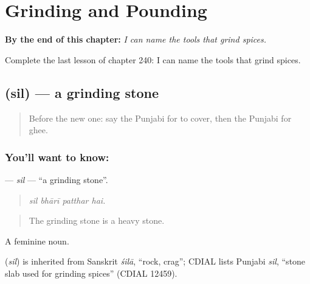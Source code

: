 
\chapter{Grinding and Pounding}
\label{ch:pa-a2-grinding-and-pounding}

\begin{chapteropening}
\textbf{By the end of this chapter:} \emph{I can name the tools that grind spices.}

Complete the last lesson of chapter 240: I can name the tools that grind spices.
\end{chapteropening}

\section[\texorpdfstring{\pa{ਸਿਲ} (sil)}{ਸਿਲ (sil)}]{ (sil) — a grinding stone}

\label{lesson:PA-C240-sil}



\begin{quote}
Before the new one: say the Punjabi for to cover, then the Punjabi for ghee.
\end{quote}

\subsection*{You'll want to know: }
\textbf{} — \emph{sil} — \textquotedblleft{}a grinding stone\textquotedblright{}.

\begin{quote}
   
\end{quote}

\begin{quote}
\emph{sil bhārī patthar hai.}
\end{quote}

\begin{quote}
The grinding stone is a heavy stone.
\end{quote}

A feminine noun.

\begin{cousinweb}
\textbf{} (\emph{sil}) is inherited from Sanskrit \emph{śilā}, \textquotedblleft{}rock, crag\textquotedblright{}; CDIAL lists Punjabi \emph{sil}, \textquotedblleft{}stone slab used for grinding spices\textquotedblright{} (CDIAL 12459).
\end{cousinweb}


